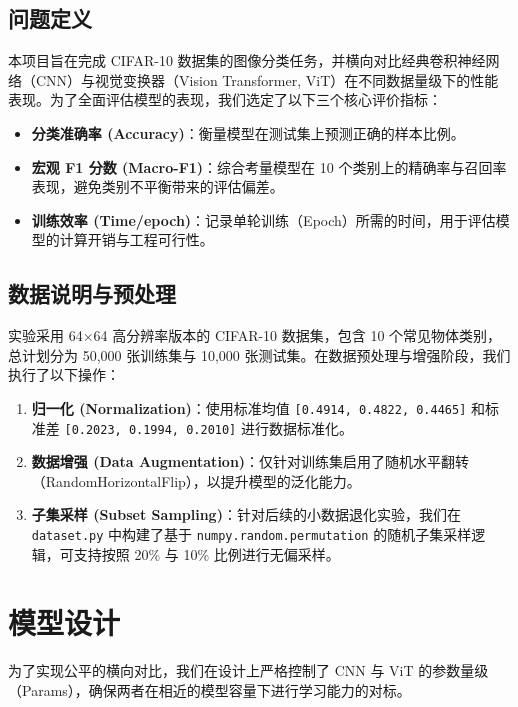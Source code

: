\documentclass[a4paper, 12pt]{article}
\begin{document}
\subsection{问题定义}
本项目旨在完成 CIFAR-10 数据集的图像分类任务，并横向对比经典卷积神经网络（CNN）与视觉变换器（Vision Transformer, ViT）在不同数据量级下的性能表现。为了全面评估模型的表现，我们选定了以下三个核心评价指标：
\begin{itemize}
    \item \textbf{分类准确率 (Accuracy)}：衡量模型在测试集上预测正确的样本比例。
    \item \textbf{宏观 F1 分数 (Macro-F1)}：综合考量模型在 10 个类别上的精确率与召回率表现，避免类别不平衡带来的评估偏差。
    \item \textbf{训练效率 (Time/epoch)}：记录单轮训练（Epoch）所需的时间，用于评估模型的计算开销与工程可行性。
\end{itemize}

\subsection{数据说明与预处理}
实验采用 64$\times$64 高分辨率版本的 CIFAR-10 数据集，包含 10 个常见物体类别，总计划分为 50,000 张训练集与 10,000 张测试集。在数据预处理与增强阶段，我们执行了以下操作：
\begin{enumerate}
    \item \textbf{归一化 (Normalization)}：使用标准均值 \texttt{[0.4914, 0.4822, 0.4465]} 和标准差 \texttt{[0.2023, 0.1994, 0.2010]} 进行数据标准化。
    \item \textbf{数据增强 (Data Augmentation)}：仅针对训练集启用了随机水平翻转（RandomHorizontalFlip），以提升模型的泛化能力。
    \item \textbf{子集采样 (Subset Sampling)}：针对后续的小数据退化实验，我们在 \texttt{dataset.py} 中构建了基于 \texttt{numpy.random.permutation} 的随机子集采样逻辑，可支持按照 20\% 与 10\% 比例进行无偏采样。
\end{enumerate}

\section{模型设计}
为了实现公平的横向对比，我们在设计上严格控制了 CNN 与 ViT 的参数量级（Params），确保两者在相近的模型容量下进行学习能力的对标。
\end{document}
